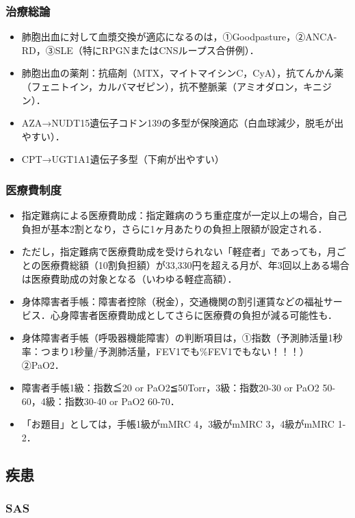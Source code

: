 \subsubsection{治療総論}

\begin{itemize}
\item 肺胞出血に対して血漿交換が適応になるのは，①Goodpasture，②ANCA-RD，③SLE（特にRPGNまたはCNSループス合併例）．
\item 肺胞出血の薬剤：抗癌剤（MTX，マイトマイシンC，CyA），抗てんかん薬（フェニトイン，カルバマゼピン），抗不整脈薬（アミオダロン，キニジン）．
\item AZA→NUDT15遺伝子コドン139の多型が保険適応（白血球減少，脱毛が出やすい）．
\item CPT→UGT1A1遺伝子多型（下痢が出やすい）
\end{itemize}


\subsubsection{医療費制度}

\begin{itemize}
\item 指定難病による医療費助成：指定難病のうち重症度が一定以上の場合，自己負担が基本2割となり，さらに1ヶ月あたりの負担上限額が設定される．
\item ただし，指定難病で医療費助成を受けられない「軽症者」であっても，月ごとの医療費総額（10割負担額）が33,330円を超える月が、年3回以上ある場合は医療費助成の対象となる（いわゆる軽症高額）．
\item 身体障害者手帳：障害者控除（税金），交通機関の割引運賃などの福祉サービス．心身障害者医療費助成としてさらに医療費の負担が減る可能性も．
\item 身体障害者手帳（呼吸器機能障害）の判断項目は，①指数（予測肺活量1秒率：つまり1秒量/予測肺活量，FEV1でも\%FEV1でもない！！！）②PaO2．
\item 障害者手帳1級：指数≦20 or PaO2≦50Torr，3級：指数20-30 or PaO2 50-60，4級：指数30-40 or PaO2 60-70．
\item 「お題目」としては，手帳1級がmMRC 4，3級がmMRC 3，4級がmMRC 1-2．
\end{itemize}

\subsection{疾患}

\subsubsection{SAS}

